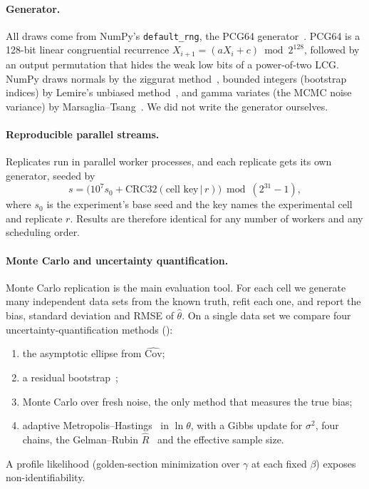 \documentclass[sigconf]{acmart}
\begin{document}
\paragraph{Generator.} All draws come from NumPy's
\texttt{default\_rng}, the PCG64
generator~\cite{harris2020numpy,oneill2014pcg}. PCG64 is a 128-bit
linear congruential recurrence $X_{i+1}=(aX_i+c)\bmod2^{128}$, followed
by an output permutation that hides the weak low bits of a power-of-two
LCG.
NumPy draws normals by the ziggurat method~\cite{marsaglia2000ziggurat},
bounded integers (bootstrap indices) by Lemire's unbiased
method~\cite{lemire2019}, and gamma variates (the MCMC noise variance) by
Marsaglia--Tsang~\cite{marsaglia2000gamma}. We did not write the
generator ourselves.

\paragraph{Reproducible parallel streams.} Replicates run in parallel
worker processes, and each replicate gets its own generator, seeded by
\begin{equation}
  s=\big(10^7 s_0+\mathrm{CRC32}(\text{cell key}\,|\,r)\big)\bmod
  (2^{31}-1),
  \label{eq:seed}
\end{equation}
where $s_0$ is the experiment's base seed and the key names the
experimental cell and replicate $r$. Results are therefore identical for
any number of workers and any scheduling order.

\paragraph{Monte Carlo and uncertainty quantification.} Monte Carlo
replication is the main evaluation tool. For each cell we generate many
independent data sets from the known truth, refit each one, and report
the bias, standard deviation and RMSE of $\hat\theta$. On a single data
set we compare four uncertainty-quantification methods ():
\begin{enumerate}
  \item the asymptotic ellipse from $\widehat{\mathrm{Cov}}$;
  \item a residual bootstrap~\cite{efron1993};
  \item Monte Carlo over fresh noise, the only method that measures the
    true bias;
  \item adaptive Metropolis--Hastings~\cite{haario2001} in $\ln\theta$,
    with a Gibbs update for $\sigma^2$, four chains, the Gelman--Rubin
    $\hat R$~\cite{gelman1992} and the effective sample size.
\end{enumerate}
A profile likelihood (golden-section minimization over $\gamma$ at each
fixed $\beta$) exposes non-identifiability.
\end{document}
